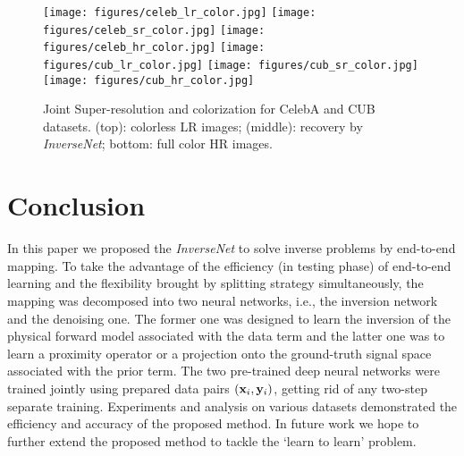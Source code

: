 \documentclass[10pt,twocolumn,letterpaper]{article}
\begin{document}
\begin{figure}[t]
\centering
\texttt{[image: figures/celeb\_lr\_color.jpg]}
\texttt{[image: figures/celeb\_sr\_color.jpg]}
\texttt{[image: figures/celeb\_hr\_color.jpg]}
\texttt{[image: figures/cub\_lr\_color.jpg]}
\texttt{[image: figures/cub\_sr\_color.jpg]}
\texttt{[image: figures/cub\_hr\_color.jpg]}
\caption{Joint Super-resolution and colorization for CelebA and CUB datasets. (top): colorless LR images; (middle): recovery by \emph{InverseNet}; {bottom}: full color HR images.}
\label{fig:sr_color}
\end{figure}

\section{Conclusion}
In this paper we proposed the \textit{InverseNet} to solve inverse problems by end-to-end mapping. 
To take the advantage of the efficiency (in testing phase) of end-to-end learning and the flexibility
brought by splitting strategy simultaneously, the mapping was decomposed into two neural networks, 
i.e., the inversion network and the denoising one. The former one was designed to learn the inversion 
of the physical forward model associated with the data term and the latter one was to learn a proximity 
operator or a projection onto the ground-truth signal space associated with the prior term. 
The two pre-trained deep neural networks were trained jointly using prepared data pairs $({\mathbf{x}}_i,{\mathbf{y}}_i)$,
getting rid of any two-step separate training. Experiments and analysis on various datasets
demonstrated the efficiency and accuracy of the proposed method. In future work we hope to further 
extend the proposed method to tackle the `learn to learn' problem.


\clearpage
\newpage

{\small


}

\newpage

\onecolumn
\end{document}
